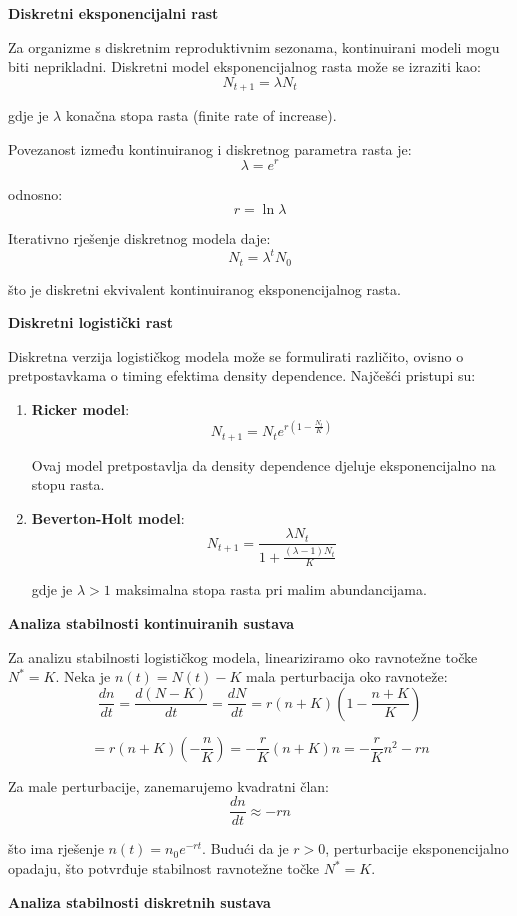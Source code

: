 \documentclass[11pt,oneside]{book}
\begin{document}
\textbf{Diskretni eksponencijalni rast}

Za organizme s diskretnim reproduktivnim sezonama, kontinuirani modeli mogu biti neprikladni. Diskretni model eksponencijalnog rasta može se izraziti kao:
$$N_{t+1} = \lambda N_t$$

gdje je $\lambda$ konačna stopa rasta (finite rate of increase).

Povezanost između kontinuiranog i diskretnog parametra rasta je:
$$\lambda = e^r$$

odnosno:
$$r = \ln \lambda$$

Iterativno rješenje diskretnog modela daje:
$$N_t = \lambda^t N_0$$

što je diskretni ekvivalent kontinuiranog eksponencijalnog rasta.

\textbf{Diskretni logistički rast}

Diskretna verzija logističkog modela može se formulirati različito, ovisno o pretpostavkama o timing efektima density dependence. Najčešći pristupi su:

\begin{enumerate}
	\item \textbf{Ricker model}:
	$$N_{t+1} = N_t e^{r(1-\frac{N_t}{K})}$$
	
	Ovaj model pretpostavlja da density dependence djeluje eksponencijalno na stopu rasta.
	
	\item \textbf{Beverton-Holt model}:
	$$N_{t+1} = \frac{\lambda N_t}{1 + \frac{(\lambda-1)N_t}{K}}$$
	
	gdje je $\lambda > 1$ maksimalna stopa rasta pri malim abundancijama.
\end{enumerate}

\textbf{Analiza stabilnosti kontinuiranih sustava}

Za analizu stabilnosti logističkog modela, lineariziramo oko ravnotežne točke $N^* = K$. Neka je $n(t) = N(t) - K$ mala perturbacija oko ravnoteže:
$$\frac{dn}{dt} = \frac{d(N-K)}{dt} = \frac{dN}{dt} = r(n+K)\left(1-\frac{n+K}{K}\right)$$

$$= r(n+K)\left(-\frac{n}{K}\right) = -\frac{r}{K}(n+K)n = -\frac{r}{K}n^2 - rn$$

Za male perturbacije, zanemarujemo kvadratni član:
$$\frac{dn}{dt} \approx -rn$$

što ima rješenje $n(t) = n_0 e^{-rt}$. Budući da je $r > 0$, perturbacije eksponencijalno opadaju, što potvrđuje stabilnost ravnotežne točke $N^* = K$.

\textbf{Analiza stabilnosti diskretnih sustava}
\end{document}
